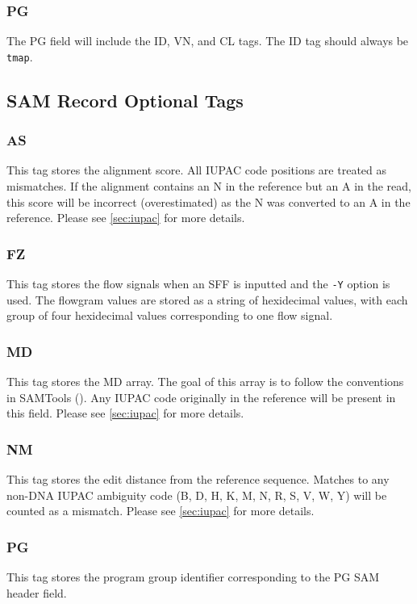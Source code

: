 \documentclass[a4paper,12pt]{book}
\newcommand{\TT}[1]{{\tt #1}} %
\begin{document}
\subsubsection{PG}
The PG field will include the ID, VN, and CL tags.
The ID tag should always be \TT{tmap}.

\subsection{SAM Record Optional Tags}

\subsubsection{AS}
This tag stores the alignment score.
All IUPAC code positions are treated as mismatches.
If the alignment contains an N in the reference but an A in the read, this score will be incorrect (overestimated) as the N was converted to an A in the reference.
Please see \autoref{sec:iupac} for more details. 

\subsubsection{FZ}
This tag stores the flow signals when an SFF is inputted and the \TT{-Y} option is used.
The flowgram values are stored as a string of hexidecimal values, with each group of four hexidecimal values corresponding to one flow signal.

\subsubsection{MD}
This tag stores the MD array.
The goal of this array is to follow the conventions in SAMTools (\cite{SAM-format}).
Any IUPAC code originally in the reference will be present in this field.
Please see \autoref{sec:iupac} for more details. 

\subsubsection{NM}
This tag stores the edit distance from the reference sequence.
Matches to any non-DNA IUPAC ambiguity code (B, D, H, K, M, N, R, S, V, W, Y) will be counted as a mismatch.
Please see \autoref{sec:iupac} for more details. 

\subsubsection{PG}
This tag stores the program group identifier corresponding to the PG SAM header field.
\end{document}
